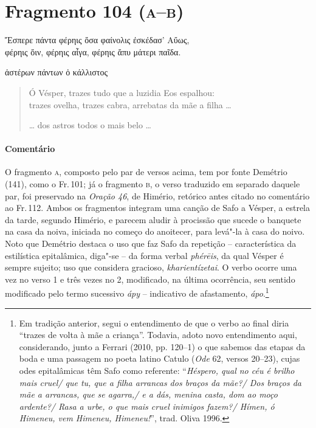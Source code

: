 \pagebreak
\section{Fragmento 104 (\textsc{a--b})}

\begin{gkverse}
Ἔσπερε πάντα φέρηις ὄσα φαίνολις ἐσκέδασ’ Αὔως,\\
      φέρηις ὄιν, φέρηις αἶγα, φέρηις ἄπυ μάτερι παῖδα.

\hspace*{35mm}

ἀστέρων πάντων ὀ κάλλιστος
\end{gkverse}

\begin{verse}
Ó Vésper, trazes tudo que a luzidia Eos espalhou:\\
trazes ovelha, trazes cabra, arrebatas da mãe a filha \ldots{}

\hspace*{35mm}

\ldots{} dos astros todos o mais belo \ldots{} 
\end{verse}

\medskip

{\paragraph{Comentário} O fragmento \textsc{a}, composto pelo par de versos acima, tem por fonte Demétrio (141),
como o Fr.\,101; já o fragmento \textsc{b}, o verso traduzido em separado daquele par,
foi preservado na \textit{Oração 46}, de Himério, retórico antes citado no comentário ao Fr.\,112.
Ambos os fragmentos integram uma canção de Safo a Vésper, a estrela da tarde,
segundo Himério, e parecem aludir à procissão que sucede o banquete na casa da
noiva, iniciada no começo do anoitecer, para levá"-la à casa do noivo.
Noto que Demétrio destaca o uso que faz Safo da repetição -- característica da estilística epitalâmica, diga"-se -- da forma verbal \textit{phérēis}, da qual Vésper é sempre sujeito; uso que considera gracioso, \textit{kharientízetai}. O verbo ocorre uma vez no verso 1 e três vezes no 2, modificado, na última ocorrência, seu sentido modificado pelo termo sucessivo \textit{ápy} -- indicativo de afastamento, \textit{ápo}.\footnote{Em tradição anterior, segui o entendimento de que o verbo ao final diria ``trazes de volta à mãe a criança''. Todavia, adoto novo entendimento aqui, considerando, junto a Ferrari (2010, pp. 120--1) o que sabemos das etapas da boda e uma passagem no poeta latino Catulo (\textit{Ode} 62, versos 20--23), cujas odes epitalâmicas têm Safo como referente: ``\textit{Héspero, qual no céu é brilho mais cruel/ que tu, que a filha arrancas dos braços da mãe?/ Dos braços da mãe a arrancas, que se agarra,/ e a dás, menina casta, dom ao moço ardente?/ Rasa a urbe, o que mais cruel inimigos fazem?/ Hímen, ó Himeneu, vem Himeneu, Himeneu!}'', trad. Oliva 1996.} }




